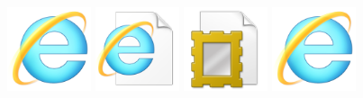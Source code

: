 \documentclass[pdflatex,sn-mathphys-num]{sn-jnl}
\begin{document}
\begin{figure}[htbp]
    \centering
    \includegraphics[width=0.22\textwidth]{images/2C490/image.png}
    \includegraphics[width=0.22\textwidth]{images/40568/image.png}
    \includegraphics[width=0.22\textwidth]{images/786A8/image.png}
    \includegraphics[width=0.22\textwidth]{images/83328/image.png} \\[1ex]
    

\end{figure}
\end{document}
